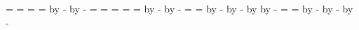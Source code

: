 {{        \pgfmathsetlength{\pgf@xa}{\xa+\radius}
        \pgfmathsetlength{\pgf@ya}{\yb-\radius}
        \pgfmathsetlength{\pgf@xb}{\xa+\radius+\offset*(\yb-\ya)}
        \pgfmathsetlength{\pgf@yb}{\ya+\radius}
        \newdimen\ax
        \newdimen\ay
        \ax=\pgf@x
        \ay=\pgf@y
        \pgfpathmoveto{\pgfpoint{\ax}{\ay}}
        \pgf@xc=\ax
        \pgf@yc=\ay
        \advance\pgf@xc by -\pgf@xb
        \advance\pgf@yc by -\pgf@yb
        \newdimen\anglea
        \pgfmathsetlength{\pgf@xc}{\xb-\radius}
        \pgf@yc=\ya
        \pgfpathlineto{\pgfpoint{\pgf@xc}{\pgf@yc}}
        \pgfmathsetlength{\pgf@xa}{\xa+\width-\radius}
        \pgfmathsetlength{\pgf@ya}{\yb-\radius}
        \pgfmathsetlength{\pgf@xb}{\xb-\radius}
        \pgfmathsetlength{\pgf@yb}{\ya+\radius}
        \newdimen\bx
        \newdimen\by
        \bx=\pgf@x
        \by=\pgf@y
        \pgf@xc=\bx
        \pgf@yc=\by
        \advance\pgf@xc by -\pgf@xb
        \advance\pgf@yc by -\pgf@yb
        \pgf@xc=\bx
        \pgf@yc=\by
        \advance\pgf@xc by -\xa
        \advance\pgf@xc by -\width
        \advance\pgf@xc by \radius
        \advance\pgf@yc by -\pgf@ya
        \pgfmathsetlength{\pgf@xc}{\xa+\radius}
        \pgfmathsetlength{\pgf@yc}{\yb-\height}
        \pgfpathlineto{\pgfpoint{\pgf@xc}{\pgf@yc}}
        \pgf@xc=\ax
        \pgf@yc=\ay
        \advance\pgf@xc by -\xa
        \advance\pgf@xc by -\radius
        \advance\pgf@yc by -\pgf@ya
        \newdimen\anglea
        \pgfpathclose
    }

}

